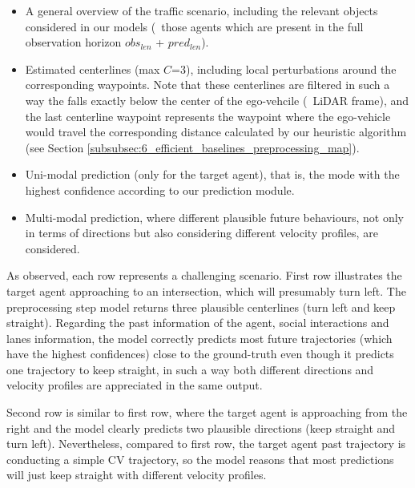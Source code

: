 \begin{itemize}
	
	\item A general overview of the traffic scenario, including the relevant objects considered in our models (\ie \ those agents which are present in the full observation horizon $obs_{len}$ + $pred_{len}$).
	
	\item Estimated centerlines (max $C$=3), including local perturbations around the corresponding waypoints. Note that these centerlines are filtered in such a way the falls exactly below the center of the ego-vehcile (\ie \ \ac{LiDAR} frame), and the last centerline waypoint represents the waypoint where the ego-vehicle would travel the corresponding distance calculated by our heuristic algorithm (see Section \ref{subsubsec:6_efficient_baselines_preprocessing_map}).
	
	\item Uni-modal prediction (only for the target agent), that is, the mode with the highest confidence according to our prediction module.
	
	\item Multi-modal prediction, where different plausible future behaviours, not only in terms of directions but also considering different velocity profiles, are considered.

\end{itemize}

As observed, each row represents a challenging scenario. First row illustrates the target agent approaching to an intersection, which will presumably turn left. The preprocessing step model returns three plausible centerlines (turn left and keep straight). Regarding the past information of the agent, social interactions and lanes information, the model correctly predicts most future trajectories (which have the highest confidences) close to the ground-truth even though it predicts one trajectory to keep straight, in such a way both different directions and velocity profiles are appreciated in the same output. 

Second row is similar to first row, where the target agent is approaching from the right and the model clearly predicts two plausible directions (keep straight and turn left). Nevertheless, compared to first row, the target agent past trajectory is conducting a simple \ac{CV} trajectory, so the model reasons that most predictions will just keep straight with different velocity profiles.

